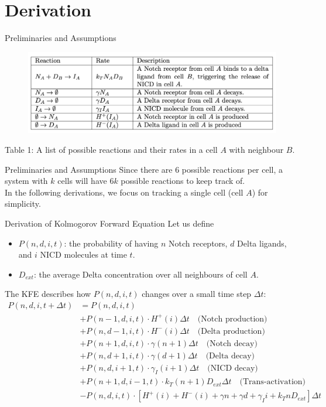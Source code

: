 \documentclass[aspectratio=169]{beamer}
\begin{document}
\section{Derivation}
\begin{frame}{Preliminaries and Assumptions}
\begin{figure}
    \centering
    \includegraphics[width=0.9\linewidth]{image0.png}
\end{figure}
    Table 1: A list of possible reactions and their rates in a cell $A$ with neighbour $B$.
\end{frame}

\begin{frame}{Preliminaries and Assumptions}
Since there are $6$ possible reactions per cell, a system with $k$ cells will have $6k$ possible reactions to keep track of. \\
\hfill\break
In the following derivations, we focus on tracking a single cell (cell $A$) for simplicity.
\end{frame}

\begin{frame}{Derivation of Kolmogorov Forward Equation}
Let us define
\begin{itemize}
    \small \item $P(n,d,i,t)$: the probability of having $n$ Notch receptors, $d$ Delta ligands, and $i$ NICD molecules at time $t$.
    \small \item $D_{ext}$: the average Delta concentration over all neighbours of cell $A$.
\end{itemize}
The KFE describes how $P(n,d,i,t)$ changes over a small time step $\Delta t$:
\small \begin{align*}
P(n,d,i,t+\Delta t) &= P(n,d,i,t) \\
&+ P(n-1,d,i,t) \cdot H^+(i) \Delta t \quad \text{(Notch production)} \\
&+ P(n,d-1,i,t) \cdot H^-(i) \Delta t \quad \text{(Delta production)} \\
&+ P(n+1,d,i,t) \cdot \gamma(n+1)\Delta t \quad \text{(Notch decay)} \\
&+ P(n,d+1,i,t) \cdot \gamma(d+1)\Delta t \quad \text{(Delta decay)} \\
&+ P(n,d,i+1,t) \cdot \gamma_I(i+1)\Delta t \quad \text{(NICD decay)} \\
&+ P(n+1,d,i-1,t) \cdot k_T(n+1)D_{ext}\Delta t \quad \text{(Trans-activation)} \\
&- P(n,d,i,t) \cdot [H^+(i) + H^-(i) + \gamma n + \gamma d + \gamma_I i + k_T n D_{ext}]\Delta t
\end{align*}
\end{frame}
\end{document}
